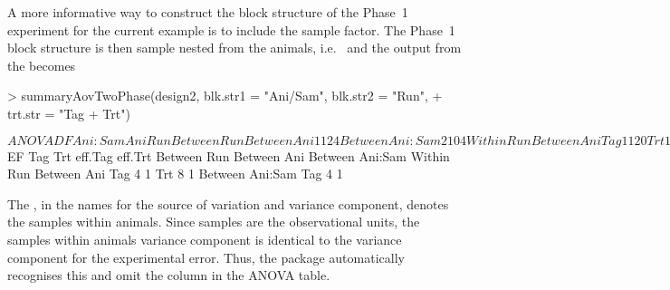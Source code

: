 \documentclass[article]{jss}
\begin{document}
A more informative way to construct the block structure of the Phase~1 experiment for the current example is to include the sample factor. The Phase~1 block structure is then sample nested from the animals, i.e.\  and the output from the  becomes
\begin{CodeChunk}
\begin{CodeInput}
> summaryAovTwoPhase(design2, blk.str1 = "Ani/Sam", blk.str2 = "Run", 
+  trt.str = "Tag + Trt")                                    
\end{CodeInput}
\begin{CodeOutput}
$ANOVA
                   DF Ani:Sam Ani Run
Between Run                          
   Between Ani     1  1       2   4  
   Between Ani:Sam 2  1       0   4  
Within Run                           
   Between Ani                       
      Tag          1  1       2   0  
      Trt          1  1       2   0  
      Residual     4  1       2   0  
   Between Ani:Sam                   
      Tag          2  1       0   0  
      Residual     4  1       0   0  
$EF
                   Tag Trt eff.Tag eff.Trt
Between Run                               
   Between Ani                            
   Between Ani:Sam                        
Within Run                                
   Between Ani                            
      Tag          4       1              
      Trt              8           1      
   Between Ani:Sam                        
      Tag          4       1               
\end{CodeOutput}
\end{CodeChunk}
The , in the names for the source of variation and variance component, denotes the samples within animals. Since samples are the observational units, the samples within animals variance component is identical to the variance component for the experimental error. Thus, the package automatically recognises this and omit the column  in the ANOVA table.
\end{document}
